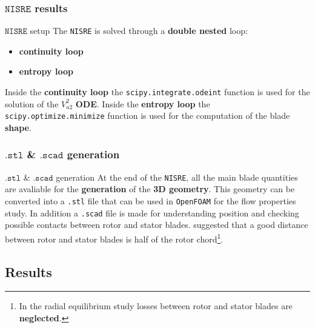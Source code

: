\subsubsection{$\mathtt{NISRE}$ results}
	\begin{frame}[fragile]{$\mathtt{NISRE}$ setup}
		The \verb|NISRE| is solved through a \textbf{double nested} loop:
		\begin{itemize}
			\item \textbf{continuity loop}
			\item \textbf{entropy loop}
		\end{itemize}
		Inside the \textbf{continuity loop} the \verb|scipy.integrate.odeint| function is used for the solution of the $V_{a2}^2$ \textbf{ODE}.
		\newline
		\newline
		Inside the \textbf{entropy loop} the \verb|scipy.optimize.minimize| function is used for the computation of the blade \textbf{shape}.
	\end{frame}

\subsubsection{$\mathtt{.stl}$ \& $\mathtt{.scad}$ generation}
	\begin{frame}[fragile]{$\mathtt{.stl}$ \& $\mathtt{.scad}$ generation}
		At the end of the \verb|NISRE|, all the main blade quantities are avaliable for the \textbf{generation} of the \textbf{3D geometry}. This geometry can be converted into a \verb|.stl| file that can be used in \verb|OpenFOAM| for the flow properties study. In addition a \verb|.scad| file is made for understanding position and checking possible contacts between rotor and stator blades.	
		\newline
		\newline 
		\cite{baskharone2006principles} suggested that a good distance between rotor and stator blades is half of the rotor chord\footnote{In the radial equilibrium study losses between rotor \newline and stator blades are \textbf{neglected}.}.
	\end{frame}

\subsection{Results}
